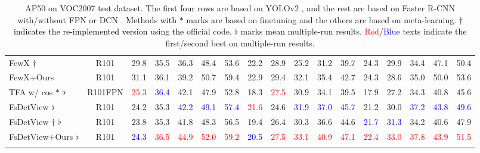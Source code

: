 \documentclass[10pt,twocolumn,letterpaper]{article}
\newcommand{\nj}[1]{\textcolor{black}{#1}}
\begin{document}
\begin{table*}
\begin{center}
\begin{tabular}{|l|c|| c|c|c|c|c|| c|c|c|c|c|| c|c|c|c|c|}
    FewX $\dagger$         & R101     & 29.8 & 35.5 & 36.3 & 48.4 & 53.6 & 22.2 & 28.9 & 25.2  & 31.2  & 39.7 & 24.3 & 29.9 & 34.4 & 47.1 & 50.4 \\
    \rowcolor{Gray}
    FewX+Ours         & R101       & 31.1 & 36.1 & 39.2 & 50.7 & 59.4 & 22.9 & 29.4 & 32.1 & 35.4 & 42.7 & 24.3 & 28.6 & 35.0 & 50.0 & 53.6 \\ 
    \hline \hline 
    TFA w/ cos $\ast$ $\flat$ \cite{wang2020frustratingly} & R101FPN     & \textcolor{red}{25.3}  & \textcolor{blue}{36.4} & 42.1 & 47.9 & 52.8 & 18.3 & \textcolor{red}{27.5} & 30.9 & 34.1 & 39.5 & 17.9 & 27.2 & 34.3 &  40.8 & 45.6\\
    FsDetView $\flat$ \cite{xiao2020few}  & R101       &24.2 & 35.3 & \textcolor{blue}{42.2} & \textcolor{blue}{49.1} & \textcolor{blue}{57.4} & \textcolor{red}{21.6} & 24.6 & \textcolor{blue}{31.9} & \textcolor{blue}{37.0} & \textcolor{blue}{45.7} & 21.2 &30.0 &\textcolor{blue}{37.2} & \textcolor{blue}{43.8} & \textcolor{blue}{49.6} \\
    FsDetView $\dagger$ $\flat$ & R101  & 23.8 & 35.3 & 41.8 & 48.3 & 56.5 &  19.4 & 26.4 & 30.3 & 36.6 & 44.6 & \textcolor{blue}{21.7} & \textcolor{blue}{31.3} & 34.2 & 40.6 & 47.9 \\
    \rowcolor{Gray}
    FsDetView+Ours $\flat$     & R101       & \textcolor{blue}{24.3} & \textcolor{red}{36.5} & \textcolor{red}{44.9} & \textcolor{red}{52.0} & \textcolor{red}{59.2} & \textcolor{blue}{20.5} & \textcolor{red}{27.5} & \textcolor{red}{33.1} & \textcolor{red}{40.9} & \textcolor{red}{47.1} & \textcolor{red}{22.4} & \textcolor{red}{33.0} & \textcolor{red}{37.8} & \textcolor{red}{43.9} & \textcolor{red}{51.5} \\
    \rowcolor{Gray}
\hline
\end{tabular}
\end{center}  
\vspace{-0.10cm}
\caption{AP50 on VOC2007 test dataset. The \nj{first four rows} are based on YOLOv2 \cite{redmon2017yolo9000}, and the rest are based on Faster R-CNN \cite{ren2015faster} with/without FPN \cite{lin2017feature} or DCN \cite{dai2017deformable}. \nj{Methods with $\ast$ marks are} based on finetuning and the others are based on meta-learning.  $\dagger$ \nj{indicates the re-implemented version} using \nj{the} official code. $\flat$ marks \nj{mean} multiple-run results. \textcolor{red}{Red}/\textcolor{blue}{Blue} texts indicate the first/second best on multiple-run results.}
\label{table:voc_novel}
\end{table*}
\end{document}
